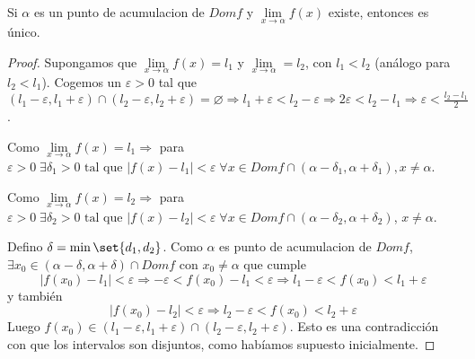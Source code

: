 \begin{theorem}
	Si \(\alpha\) es un punto de acumulacion de \(Domf \) y \(\lim\limits_{x  \to \alpha} f(x )\) existe, entonces es único.
\end{theorem}
\begin{proof}
	Supongamos que \(\lim\limits_{x \to \alpha} f(x) = l_1 \) y \(\lim\limits_{x \to \alpha} = l_2 \), con \(l_1 < l_2 \) (análogo para \(l_2 < l_1\)). Cogemos un \(\varepsilon > 0 \) tal que \((l_1 - \varepsilon, l_1 + \varepsilon) \cap (l_2 - \varepsilon, l_2 + \varepsilon) = \varnothing \Rightarrow l_1 + \varepsilon < l_2 - \varepsilon \Rightarrow 2\varepsilon < l_2 - l_1 \Rightarrow \varepsilon < \frac{l_2 - l_1 }{2}\).

	Como \(\lim\limits_{x  \to \alpha} f(x) = l_1 \Rightarrow  \) para \(\varepsilon > 0 \; \exists \delta_1 > 0 \text{ tal que }  \left\vert f(x) - l_1  \right\vert < \varepsilon \; \forall x \in Domf \cap (\alpha - \delta_1, \alpha + \delta_1 ), x \neq \alpha\).

	Como \(\lim\limits_{x  \to \alpha } f(x) = l_2 \Rightarrow \) para \(\varepsilon > 0 \; \exists \delta_2 > 0 \text{ tal que }  \left\vert f(x) - l_2  \right\vert < \varepsilon \; \forall x \in Domf \cap (\alpha - \delta_2, \alpha + \delta_2 )\), \(x \neq \alpha \).

	Defino \(\delta = \min\set{d_1, d_2 }\). Como \(\alpha \) es punto de acumulacion de \(Domf \), \(\exists x_0 \in (\alpha - \delta, \alpha + \delta) \cap Domf \) con \(x_0 \neq \alpha\) que cumple
	\[
		\left\vert f(x_0) - l_1  \right\vert < \varepsilon \Rightarrow - \varepsilon < f(x_0) - l_1 < \varepsilon \Rightarrow l_1 - \varepsilon < f(x_0) < l_1 + \varepsilon
	\]
	y también
	\[
		\left\vert f(x_0) - l_2  \right\vert < \varepsilon \Rightarrow l_2 - \varepsilon < f(x_0) < l_2 + \varepsilon
	\]
	Luego \(f(x_0) \in (l_1 - \varepsilon, l_1 + \varepsilon) \cap (l_2 - \varepsilon, l_2 + \varepsilon)\). Esto es una contradicción con que los intervalos son disjuntos, como habíamos supuesto inicialmente.
\end{proof}


